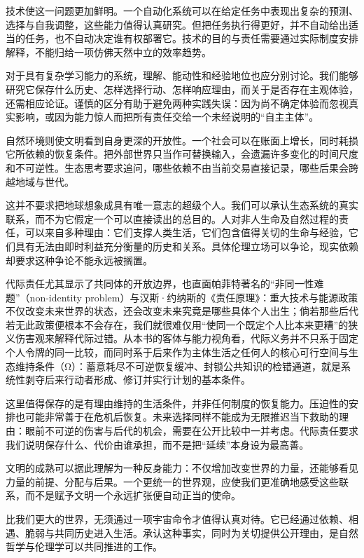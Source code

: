 \documentclass[
  11pt,
  oneside]{book}
\begin{document}
技术使这一问题更加鲜明。一个自动化系统可以在给定任务中表现出复杂的预测、选择与自我调整，这些能力值得认真研究。但把任务执行得更好，并不自动给出适当的任务，也不自动决定谁有权部署它。技术的目的与责任需要通过实际制度安排解释，不能归给一项仿佛天然中立的效率趋势。

对于具有复杂学习能力的系统，理解、能动性和经验地位也应分别讨论。我们能够研究它保存什么历史、怎样选择行动、怎样响应理由，而关于是否存在主观体验，还需相应论证。谨慎的区分有助于避免两种实践失误：因为尚不确定体验而忽视真实影响，或因为能力惊人而把所有责任交给一个未经说明的``自主主体''。

自然环境则使文明看到自身更深的开放性。一个社会可以在账面上增长，同时耗损它所依赖的恢复条件。把外部世界只当作可替换输入，会遗漏许多变化的时间尺度和不可逆性。生态思考要求追问，哪些依赖不由当前交易直接记录，哪些后果会跨越地域与世代。

这并不要求把地球想象成具有唯一意志的超级个人。我们可以承认生态系统的真实联系，而不为它假定一个可以直接读出的总目的。人对非人生命及自然过程的责任，可以来自多种理由：它们支撑人类生活，它们包含值得关切的生命与经验，它们具有无法由即时利益充分衡量的历史和关系。具体伦理立场可以争论，现实依赖却要求这种争论不能永远被搁置。

代际责任尤其显示了共同体的开放边界，也直面帕菲特著名的``非同一性难题''（non-identity problem）与汉斯·约纳斯的《责任原理》：重大技术与能源政策不仅改变未来世界的状态，还会改变未来究竟是哪些具体个人出生；倘若那些后代若无此政策便根本不会存在，我们就很难仅用``使同一个既定个人比本来更糟''的狭义伤害观来解释代际过错。从本书的客体与能力视角看，代际义务并不只系于固定个人令牌的同一比较，而同时系于后来作为主体生活之任何人的核心可行空间与生态维持条件（Ω）：蓄意耗尽不可逆恢复缓冲、封锁公共知识的检错通道，就是系统性剥夺后来行动者形成、修订并实行计划的基本条件。

这里值得保存的是有理由维持的生活条件，并非任何制度的恢复能力。压迫性的安排也可能非常善于在危机后恢复。未来选择同样不能成为无限推迟当下救助的理由：眼前不可逆的伤害与后代的机会，需要在公开比较中一并考虑。代际责任要求我们说明保存什么、代价由谁承担，而不是把``延续''本身设为最高善。

文明的成熟可以据此理解为一种反身能力：不仅增加改变世界的力量，还能够看见力量的前提、分配与后果。一个更统一的世界观，应使我们更准确地感受这些联系，而不是赋予文明一个永远扩张便自动正当的使命。

\begingroup{}

比我们更大的世界，无须通过一项宇宙命令才值得认真对待。它已经通过依赖、相遇、脆弱与共同历史进入生活。承认这种事实，同时为关切提供公开理由，是自然哲学与伦理学可以共同推进的工作。
\end{document}
